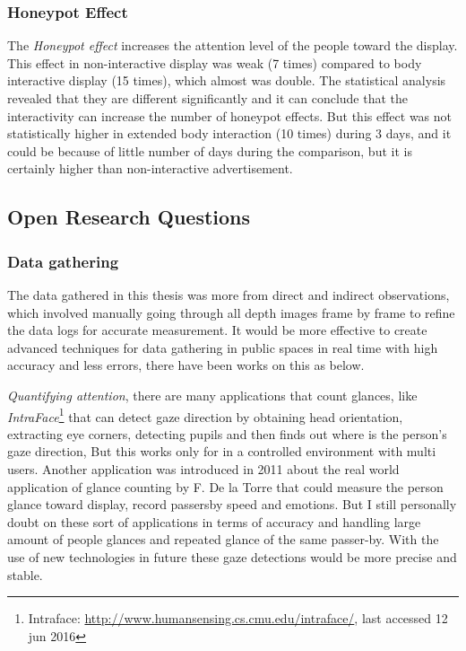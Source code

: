 \subsubsection{Honeypot Effect}
The \emph{Honeypot effect} increases the attention level of the people toward the display. This effect in non-interactive display was weak (7 times) compared to body interactive display (15 times), which almost was double. The statistical analysis revealed that they are different significantly and it can conclude that the interactivity can increase the number of honeypot effects. But this effect was not statistically higher in extended body interaction (10 times) during 3 days, and it could be because of little number of days during the comparison, but it is certainly higher than non-interactive advertisement.



\subsection{Open Research Questions}


\subsubsection{Data gathering}

The data gathered in this thesis was more from direct and indirect observations, which involved manually going through all depth images frame by frame to refine the data logs for accurate measurement. It would be more effective to create advanced techniques for data gathering in public spaces in real time with high accuracy and less errors, there have been works on this as below.

\emph{Quantifying attention}, there are many applications that count glances, like \emph{IntraFace}\footnote{Intraface: \url{ http://www.humansensing.cs.cmu.edu/intraface/}, last accessed 12 jun 2016}\cite{Intraface} that can detect gaze direction by obtaining head orientation, extracting eye corners, detecting pupils and then finds out where is the person’s gaze direction, But this works only for in a controlled environment with multi users.  Another application was introduced in 2011 about the real world application of glance counting by F. De la Torre \cite{glancingcount} that could measure the person glance toward display, record passersby speed and emotions. But I still personally doubt on these sort of applications in terms of accuracy and handling large amount of people glances and repeated glance of the same passer-by. With the use of new technologies in future these gaze detections would be more precise and stable.

